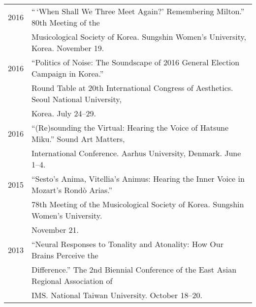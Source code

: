 \documentclass[a4paper,11pt,draft]{article}
\begin{document}
\begin{tabular}{p{2.5cm} p{12.5cm}}
    2016 & “\,‘When Shall We Three Meet Again?’ Remembering Milton.” 80th
    Meeting of the\\
    & Musicological Society of Korea. Sungshin Women’s University, Korea.
    November 19.\\[2mm]

    2016 & “Politics of Noise: The Soundscape of 2016 General Election Campaign
    in Korea.”\\
    & Round Table at 20th International Congress of Aesthetics. Seoul National
    University,\\
    & Korea. July 24--29.\\[2mm]
  
    2016 & “(Re)sounding the Virtual: Hearing the Voice of Hatsune Miku.” Sound
    Art Matters,\\
    & International Conference. Aarhus University, Denmark. June 1--4.\\[2mm]
  
    2015 & “Sesto’s Anima, Vitellia’s Animus: Hearing the Inner Voice in
    Mozart’s Rond\`{o} Arias.”\\
    & 78th Meeting of the Musicological Society of Korea. Sungshin Women’s
    University.\\
    & November 21.\\[2mm]
  
    2013 & “Neural Responses to Tonality and Atonality: How Our Brains Perceive
    the\\
    & Difference.” The 2nd Biennial Conference of the East Asian Regional
    Association of\\
    & IMS. National Taiwan University. October 18–20.\\[2mm]
    
    
    

\end{tabular}
\end{document}
